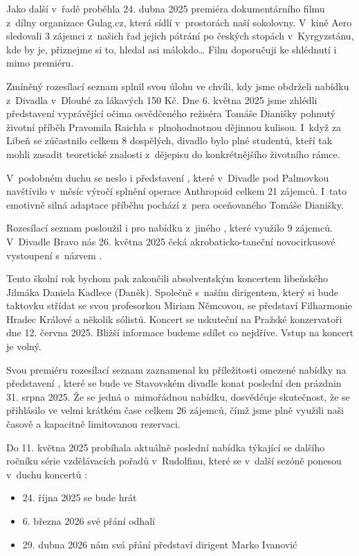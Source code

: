 \documentclass[11pt]{article}
\begin{document}
Jako další v~řadě proběhla 24. dubna 2025 premiéra dokumentárního filmu
 z~dílny organizace Gulag.cz, která sídlí v~prostorách
naší sokolovny. V~kině Aero sledovali 3 zájemci z~našich řad jejich
pátrání po českých stopách v~Kyrgyzstánu, kde by je, přiznejme si to,
hledal asi málokdo\ldots{} Film doporučuji ke shlédnutí i mimo premiéru.

Zmíněný rozesílací seznam splnil svou úlohu ve chvíli, kdy jsme obdrželi
 nabídku z~Divadla v~Dlouhé za lákavých 150 Kč. Dne 6.
května 2025 jsme zhlédli představení  vyprávějící očima
osvědčeného režiséra Tomáše Dianišky pohnutý životní příběh Pravomila
Raichla s~plnohodnotnou dějinnou kulisou. I~když za Libeň se zúčastnilo
celkem 8 dospělých, divadlo bylo plné studentů, kteří tak mohli zasadit
teoretické znalosti z~dějepisu do konkrétnějšího životního rámce.

V~podobném duchu se neslo i představení , které
v~Divadle pod Palmovkou navštívilo v~měsíc výročí splnění operace
Anthropoid celkem 21 zájemců. I~tato emotivně silná adaptace příběhu
pochází z~pera oceňovaného Tomáše Dianišky.

Rozesílací seznam posloužil i pro nabídku
z~jiného , které využilo 9 zájemců. V~Divadle Bravo nás 26.
května 2025 čeká akrobaticko-taneční novocirkusové vystoupení s~názvem
.

Tento školní rok bychom pak zakončili absolventským koncertem libeňského
Jilmáka Daniela Kadlece (Daněk). Společně s~naším dirigentem, který si
bude taktovku střídat se svou profesorkou Miriam Němcovou, se představí
Filharmonie Hradec Králové a několik sólistů. Koncert se uskuteční na
Pražské konzervatoři dne 12. června 2025. Bližší informace budeme sdílet
co nejdříve. Vstup na koncert je volný.

Svou premiéru rozesílací seznam zaznamenal ku příležitosti omezené
nabídky na představení , které se bude ve
Stavovském divadle konat poslední den prázdnin 31. srpna 2025. Že se
jedná o~mimořádnou nabídku, dosvědčuje skutečnost, že se přihlásilo ve
velmi krátkém čase celkem 26 zájemců, čímž jsme plně využili naši časově
a kapacitně limitovanou rezervaci.

Do 11. května 2025 probíhala aktuálně poslední nabídka týkající se
dalšího ročníku série vzdělávacích pořadů v~Rudolfinu, které se v~další
sezóně ponesou v~duchu koncertů :


\begin{itemize}[
  itemsep=-3pt,
  leftmargin=1em,
  itemindent=-1em
]
\item[] 24. října 2025 se bude hrát 
\item[] 6. března 2026 své přání odhalí 
\item[] 29. dubna 2026 nám svá přání představí dirigent Marko Ivanović
\end{itemize}
\end{document}
